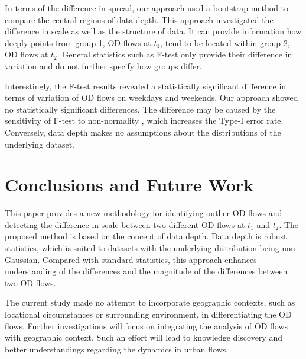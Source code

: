 \documentclass[a4paper,UKenglish]{lipics-v2018}
\begin{document}
In terms of the difference in spread, our approach used a bootstrap method to compare the central regions of data depth.
This approach investigated the difference in scale as well as the structure of data.
It can provide information how deeply points from group 1, OD flows at $t_1$, tend to be located within group 2, OD flows at $t_2$.
General statistics such as F-test only provide their difference in variation and do not further specify how groups differ. 

Interestingly, the F-test results revealed a statistically significant difference in terms of variation of OD flows on weekdays and weekends.
Our approach showed no statistically significant differences.
The difference may be caused by the sensitivity of F-test to non-normality \cite{Field12book}, which increases the Type-I error rate.
Conversely, data depth makes no assumptions about the distributions of the underlying dataset.


\section{Conclusions and Future Work}
\label{sec:conclusions}

This paper provides a new methodology for identifying outlier OD flows and detecting the difference in scale between two different OD flows at $t_1$ and $t_2$.
The proposed method is based on the concept of data depth.
Data depth is robust statistics, which is suited to datasets with the underlying distribution being non-Gaussian.
Compared with standard statistics, this approach enhances understanding of the differences and the magnitude of the differences between two OD flows.


The current study made no attempt to incorporate geographic contexts, such as locational circumstances or surrounding environment, in differentiating the OD flows. 
Further investigations will focus on integrating the analysis of OD flows with geographic context.
Such an effort will lead to knowledge discovery and better understandings regarding the dynamics in urban flows.





\end{document}
